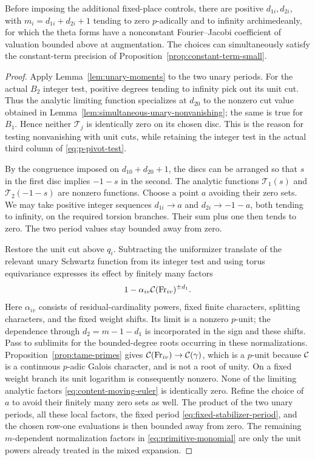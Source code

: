\begin{lemma}\label{lem:bounded-uncontrolled-content}
 Before imposing the additional fixed-place controls, there are
 positive $d_{1i},d_{2i}$, with $m_i=d_{1i}+d_{2i}+1$ tending to zero
 $p$-adically and to infinity archimedeanly, for which the theta forms
 have a nonconstant Fourier--Jacobi coefficient of valuation bounded
 above at augmentation.  The choices can simultaneously satisfy the
 constant-term precision of Proposition~\ref{prop:constant-term-small}.
\end{lemma}
\begin{proof}
 Apply Lemma~\ref{lem:unary-moments} to the two unary periods.  For the
 actual $B_2$ integer test, positive degrees tending to infinity pick
 out its unit cut.  Thus the analytic limiting function specializes at
 $d_{20}$ to the nonzero cut value obtained in
 Lemma~\ref{lem:simultaneous-unary-nonvanishing}; the same is true for
 $B_1$.  Hence neither $\mathcal T_j$ is identically zero on its
 chosen disc.  This is the reason for testing nonvanishing with unit cuts,
 while retaining the integer test in the actual third column of
 \eqref{eq:p-pivot-test}.

 By the congruence imposed on $d_{10}+d_{20}+1$, the discs can be
 arranged so that $s$ in the first disc implies $-1-s$ in the second.
 The analytic functions $\mathcal T_1(s)$ and
 $\mathcal T_2(-1-s)$ are nonzero functions.  Choose a point $a$ avoiding
 their zero sets.  We may take positive integer sequences
 $d_{1i}\to a$ and $d_{2i}\to-1-a$, both tending to infinity, on the
 required torsion branches.  Their sum plus one then tends to zero.
 The two period values stay bounded away from zero.

 Restore the unit cut above $q_i$.  Subtracting the uniformizer
 translate of the relevant unary Schwartz function from its integer
 test and using torus equivariance expresses its effect by finitely
 many factors
 \begin{equation}\label{eq:content-moving-euler}
  1-\alpha_{iv}\mathcal C(\operatorname{Fr}_{iv})^{\pm d_1}.
 \end{equation}
 Here $\alpha_{iv}$ consists of residual-cardinality powers, fixed
 finite characters, splitting characters, and the fixed weight shifts.
 Its limit is a nonzero $p$-unit; the dependence through
 $d_2=m-1-d_1$ is incorporated in the sign and these shifts.
 Pass to sublimits for the bounded-degree roots occurring in these
 normalizations.  Proposition~\ref{prop:tame-primes} gives
 $\mathcal C(\operatorname{Fr}_{iv})\to\mathcal C(\gamma)$, which is a $p$-unit because
 $\mathcal C$ is a continuous $p$-adic Galois character, and is not a root of unity.
 On a fixed weight branch its unit logarithm is consequently nonzero.
 None of the limiting analytic factors
 \eqref{eq:content-moving-euler} is identically zero.  Refine the
 choice of $a$ to avoid their finitely many zero sets as well.
 The product of the two unary periods, all these local factors,
 the fixed period \eqref{eq:fixed-stabilizer-period}, and the chosen
 row-one evaluations is then bounded away from zero.  The remaining
 $m$-dependent normalization factors in
 \eqref{eq:primitive-monomial} are only the unit powers already
 treated in the mixed expansion.


\end{proof}
